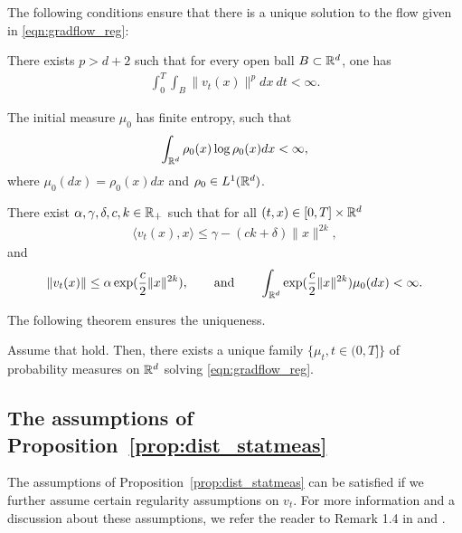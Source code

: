 The following conditions ensure that there is a unique solution to the flow given in \eqref{eqn:gradflow_reg}:
\begin{assumption}
\label{asmp:flowunq_1}
There exists $p>d+2$ such that for every open ball $B \subset \mathbb{R}^d$, one has
\begin{align}
\int_0^T \int_B \|v_t(x)\|^p dx\> dt < \infty.
\end{align}
\end{assumption}
%
\begin{assumption}
\label{asmp:flowunq_2}
The initial measure $\mu_0$ has finite entropy, such that
\begin{align}
\int_{\mathbb{R}^d} \rho_0(x) \log \rho_0(x) dx < \infty,
\end{align}
where $\mu_0(dx) = \rho_0(x)dx$ and $\rho_0 \in L^1(\mathbb{R}^d)$.
\end{assumption}
%
\begin{assumption}
\label{asmp:flowunq_3}
There exist $\alpha, \gamma, \delta, c, k \in \mathbb{R}_+$ such that for all $(t,x) \in [0,T] \times \mathbb{R}^d$ 
\begin{align}
\langle v_t(x), x \rangle \leq \gamma - (ck + \delta) \| x\|^{2k},
\end{align}
and 
\begin{align}
\label{asmp:flowunq_4}
\|v_t(x)\| \leq \alpha \exp(\frac{c}{2} \|x\|^{2k}), \qquad \text{and} \qquad \int_{\mathbb{R}^d} \exp(\frac{c}{2}\|x\|^{2k} ) \mu_0(dx) < \infty.
\end{align}
\end{assumption}

The following theorem ensures the uniqueness.
\begin{thm}
Assume that  hold. Then, there exists a unique family $\{\mu_t, t\in(0,T]\}$ of probability measures on $\mathbb{R}^d$ solving \eqref{eqn:gradflow_reg}.
\end{thm}

\subsection{The assumptions of Proposition~\ref{prop:dist_statmeas}}

The assumptions of Proposition~\ref{prop:dist_statmeas} can be satisfied if we further assume certain regularity assumptions on $v_t$. For more information and a discussion about these assumptions, we refer the reader to Remark 1.4 in \cite{bogachev2016distances} and \cite{bogachev2006global,bogachev2008estimates}.



